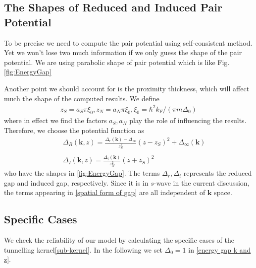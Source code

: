 \subsection{The Shapes of Reduced and Induced Pair Potential}
To be precise we need to compute the pair potential using self-consistent method\citep{Reference11}. Yet we won't lose two much information if we only guess the shape of the pair potential\citep{Reference8, Reference4}. We are using parabolic shape of pair potential which is like Fig.\ref{fig:EnergyGap}

Another point we should account for is the proximity thickness, which will affect much the shape of the computed results. We define
\begin{eqnarray}
z_S=a_S\pi\xi_0,z_N=a_N\pi\xi_0,\xi_0=\hbar^2k_F/(\pi m\Delta_0)
\end{eqnarray}
where in effect we find the factors $a_S,a_N$ play the role of influencing the results.
Therefore, we choose the potential function as 
\begin{eqnarray}\label{spatial form of gap}
&&\Delta_R(\mathbf{k},z)=\frac{\Delta_r(\mathbf{k})-\Delta_{\infty}}{z_S^2}(z-z_S)^2+\Delta_{\infty}(\mathbf{k})\nonumber\\
&&\\
&&\Delta_I(\mathbf{k},z)=\frac{\Delta_i(\mathbf{k})}{z_N^2}(z+z_S)^2\nonumber
\end{eqnarray}
who have the shapes in \ref{fig:EnergyGap}. The terms $\Delta_r,\Delta_i$ represents the reduced gap and induced gap, respectively. Since it is in $s$-wave in the current discussion, the terms appearing in \eqref{spatial form of gap} are all independent of $\mathbf{k}$ space.

\subsection{Specific Cases}
We check the reliability of our model by calculating the specific cases of the tunnelling kernel\eqref{sub-kernel}. In the following we set $\Delta_0=1$ in \eqref{energy gap k and z}.

